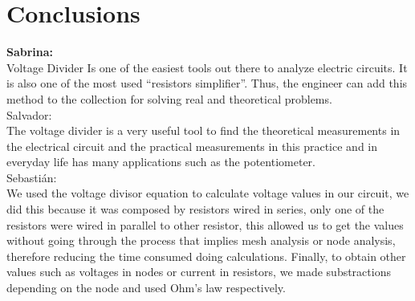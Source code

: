 \documentclass[letterpaper]{article}
\begin{document}
\section{Conclusions}
{\large\textbf{Sabrina:}}\\
Voltage Divider Is one of the easiest tools out there to analyze electric circuits. It is also one of the most used “resistors simplifier”. Thus, the engineer can add this method to the collection for solving real and theoretical problems.
\\[2ex]
{\large Salvador:}\\
The voltage divider is a very useful tool to find the theoretical measurements in the electrical circuit and the practical measurements in this practice
and in everyday life has many applications such as the potentiometer.
\\[2ex]
{\large Sebastián:}\\
We used the voltage divisor equation to calculate voltage values in our circuit, we did this because
it was composed by resistors wired in series, only one of the resistors were wired in parallel to
other resistor, this allowed us to get the values without going through the process that implies
mesh analysis or node analysis, therefore reducing the time consumed doing calculations. Finally, to
obtain other values such as voltages in nodes or current in resistors, we made substractions
depending on the node and used Ohm's law respectively.
\end{document}

